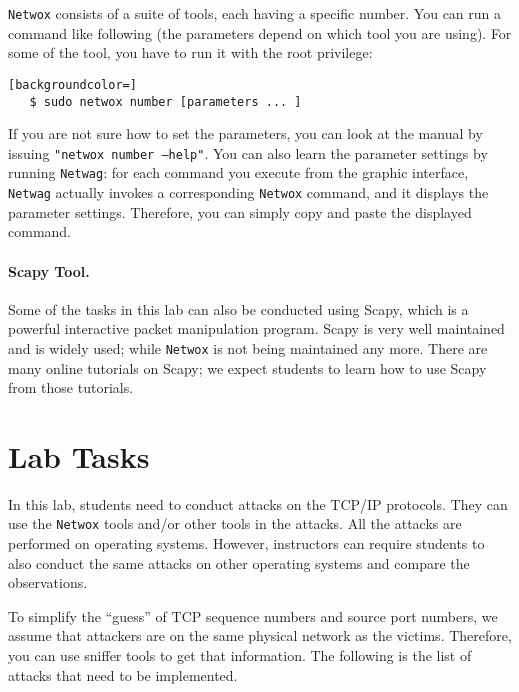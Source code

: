 {\tt Netwox} consists of a suite of tools, each having a specific number. 
You can run a command like following (the parameters depend on
which tool you are using). For some of the tool, you have to run it 
with the root privilege: 

\begin{lstlisting}[backgroundcolor=]
   $ sudo netwox number [parameters ... ]
\end{lstlisting}


If you are not sure how to set the parameters, you can look at the 
manual by issuing {\tt "netwox number --help"}.
You can also learn the parameter settings by running {\tt Netwag}:
for each command you execute from the graphic interface, {\tt Netwag} 
actually invokes a corresponding {\tt Netwox} command, and it displays
the parameter settings. Therefore, you can simply copy and paste 
the displayed command.


\paragraph{Scapy Tool.}
Some of the tasks in this lab can also be conducted using Scapy, which 
is a powerful interactive packet manipulation program. 
Scapy is very well maintained and is widely used; while
\texttt{Netwox} is not being maintained any more. There are many online tutorials on Scapy; we
expect students to learn how to use Scapy from those tutorials. 





\section{Lab Tasks}


In this lab, students need to conduct attacks on the TCP/IP protocols. 
They can use the {\tt Netwox} tools and/or other tools in the attacks. 
All the attacks are performed on \linux operating systems. 
However, instructors can require students to also conduct 
the same attacks on other operating systems and compare the 
observations.



To simplify the ``guess'' of TCP sequence numbers and source port numbers, 
we assume that attackers are on the same physical network as the victims. 
Therefore, you can use sniffer tools to get that information.
The following is the list of attacks that need to be implemented.



